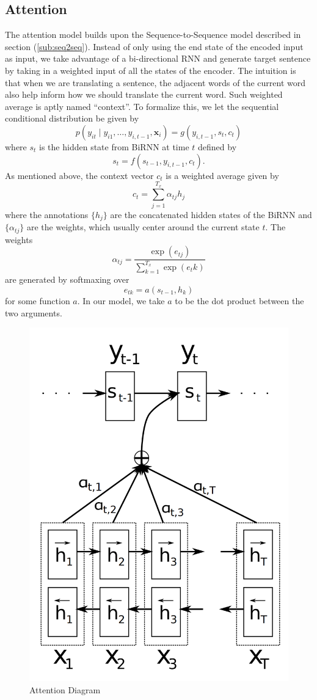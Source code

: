 \documentclass[12pt]{article}
\begin{document}
\subsection{Attention}
\label{sub:attn}
The attention model builds upon the Sequence-to-Sequence model described in section (\ref{sub:seq2seq}). Instead of only using the end state of the encoded input as input, we take advantage of a bi-directional RNN and generate target sentence by taking in a weighted input of all the states of the encoder. The intuition is that when we are translating a sentence, the adjacent words of the current word also help inform how we should translate the current word. Such weighted average is aptly named ``context''. To formalize this, we let the sequential conditional distribution be given by
\begin{equation}
	p(y_{it} \mid y_{i1}, \dots, y_{i,t-1}, \bm x_i) = g(y_{i,t-1}, s_t, c_t)
\end{equation}
where $s_t$ is the hidden state from BiRNN at time $t$ defined by
\begin{equation}
	s_t = f(s_{t-1}, y_{i,t-1}, c_t).
\end{equation}
As mentioned above, the context vector $c_t$ is a weighted average given by
\begin{equation}
	c_t = \sum_{j=1}^{T_x} \alpha_{tj} h_j
\end{equation}
where the annotations $\{h_j\}$ are the concatenated hidden states of the BiRNN and $\{\alpha_{tj}\}$ are the weights, which usually center around the current state $t$. The weights 
\begin{equation}
	\alpha_{tj} = \frac{\exp(e_{tj})}{\sum_{k=1}^{T_x} \exp(e_tk)}
\end{equation}
are generated by softmaxing over
\begin{equation}
	e_{tk} = a(s_{t-1}, h_k)
\end{equation}
for some function $a$. In our model, we take $a$ to be the dot product between the two arguments.

\begin{figure}
	\centering
	\includegraphics[width=0.4\linewidth]{figs/attn_diagram}
	\caption{Attention Diagram}
	\label{attn_diagram}
\end{figure}
\end{document}
